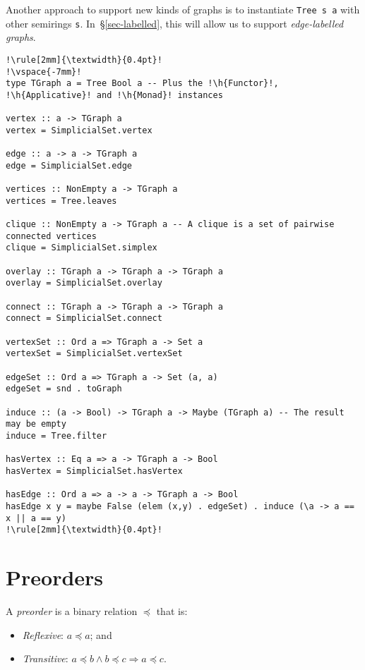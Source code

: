 \documentclass[english,submission]{programming}
\newcommand{\code}[1]{\lstinline[mathescape]|#1|}
\newcommand{\hcode}[1]{{\color{darkblue} \lstinline[keywordstyle={}]|#1|}} %
\newcommand{\h}[1]{{\itshape\color{grayblue}#1}} %
\begin{document}
\noindent
Another approach to support new kinds of graphs is to instantiate
\hcode{Tree s a} with other semirings \hcode{s}. In~\S\ref{sec-labelled}, this
will allow us to support \emph{edge-labelled graphs}.

\begin{lstlisting}[float,label=lst-graph,xleftmargin=0pt,caption={
    Implementing a part of the \code{Algebra.G}\code{raph} API~\cite{mokhov_alga}
    with \hcode{TGraph}.
}]
!\rule[2mm]{\textwidth}{0.4pt}!
!\vspace{-7mm}!
type TGraph a = Tree Bool a -- Plus the !\h{Functor}!, !\h{Applicative}! and !\h{Monad}! instances

vertex :: a -> TGraph a
vertex = SimplicialSet.vertex

edge :: a -> a -> TGraph a
edge = SimplicialSet.edge

vertices :: NonEmpty a -> TGraph a
vertices = Tree.leaves

clique :: NonEmpty a -> TGraph a -- A clique is a set of pairwise connected vertices
clique = SimplicialSet.simplex

overlay :: TGraph a -> TGraph a -> TGraph a
overlay = SimplicialSet.overlay

connect :: TGraph a -> TGraph a -> TGraph a
connect = SimplicialSet.connect

vertexSet :: Ord a => TGraph a -> Set a
vertexSet = SimplicialSet.vertexSet

edgeSet :: Ord a => TGraph a -> Set (a, a)
edgeSet = snd . toGraph

induce :: (a -> Bool) -> TGraph a -> Maybe (TGraph a) -- The result may be empty
induce = Tree.filter

hasVertex :: Eq a => a -> TGraph a -> Bool
hasVertex = SimplicialSet.hasVertex

hasEdge :: Ord a => a -> a -> TGraph a -> Bool
hasEdge x y = maybe False (elem (x,y) . edgeSet) . induce (\a -> a == x || a == y)
!\rule[2mm]{\textwidth}{0.4pt}!
\end{lstlisting}

\section{Preorders}\label{sec-preorder}

A \emph{preorder} is a binary relation $\preceq$ that is:

\begin{itemize}
    \item \emph{Reflexive}: $a \preceq a$; and
    \item \emph{Transitive}: $a \preceq b \wedge b \preceq c \Rightarrow a \preceq c$.
\end{itemize}
\end{document}
